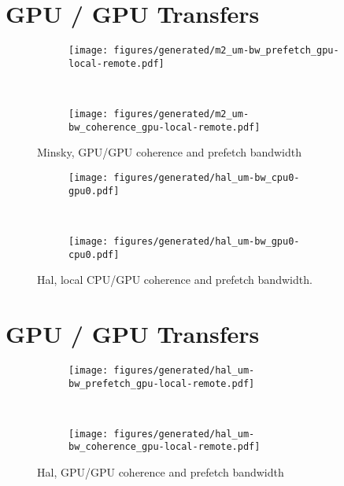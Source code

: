 \section{GPU / GPU Transfers}

\begin{figure}[ht]
    \centering
    \begin{subfigure}[b]{0.45\textwidth}
        \texttt{[image: figures/generated/m2\_um-bw\_prefetch\_gpu-local-remote.pdf]}
        \caption{}
        \label{}
    \end{subfigure}
    ~
    \begin{subfigure}[b]{0.45\textwidth}
        \texttt{[image: figures/generated/m2\_um-bw\_coherence\_gpu-local-remote.pdf]}
        \caption{}
        \label{}
    \end{subfigure}
    \caption[]{Minsky, GPU/GPU coherence and prefetch bandwidth}
    \label{}
\end{figure}


\begin{figure}[ht]
    \centering
    \begin{subfigure}[b]{0.45\textwidth}
        \texttt{[image: figures/generated/hal\_um-bw\_cpu0-gpu0.pdf]}
        \caption{}
        \label{}
    \end{subfigure}
    ~
    \begin{subfigure}[b]{0.45\textwidth}
        \texttt{[image: figures/generated/hal\_um-bw\_gpu0-cpu0.pdf]}
        \caption{}
        \label{}
    \end{subfigure}
    \caption[]{Hal, local CPU/GPU coherence and prefetch bandwidth.}
    \label{}
\end{figure}

\section{GPU / GPU Transfers}

\begin{figure}[ht]
    \centering
    \begin{subfigure}[b]{0.45\textwidth}
        \texttt{[image: figures/generated/hal\_um-bw\_prefetch\_gpu-local-remote.pdf]}
        \caption{}
        \label{}
    \end{subfigure}
    ~
    \begin{subfigure}[b]{0.45\textwidth}
        \texttt{[image: figures/generated/hal\_um-bw\_coherence\_gpu-local-remote.pdf]}
        \caption{}
        \label{}
    \end{subfigure}
    \caption[]{Hal, GPU/GPU coherence and prefetch bandwidth}
    \label{}
\end{figure}


